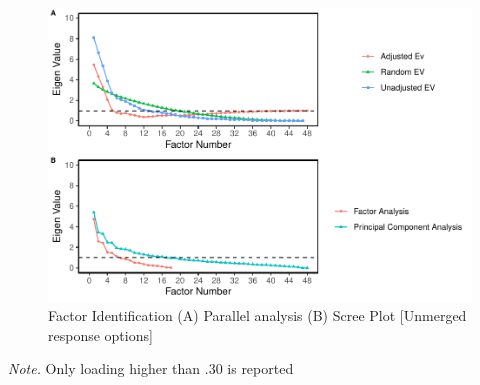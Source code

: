 \documentclass[
  english,
  man]{apa6}
\begin{document}
\begin{appendix}
\begin{center}
\begin{ThreePartTable}
\end{ThreePartTable}
\end{center}

\begin{figure}
\centering
\includegraphics{manuscript_files/figure-latex/facIdFigAppB-20-1.pdf}
\caption{\label{fig:facIdFigAppB-20}Factor Identification (A) Parallel
analysis (B) Scree Plot {[}Unmerged response options{]}}
\end{figure}

\begin{center}
\begin{ThreePartTable}

\begin{TableNotes}[para]
\normalsize{\textit{Note.} Only loading higher than .30 is reported}
\end{TableNotes}


\end{ThreePartTable}
\end{center}
\end{appendix}
\end{document}
